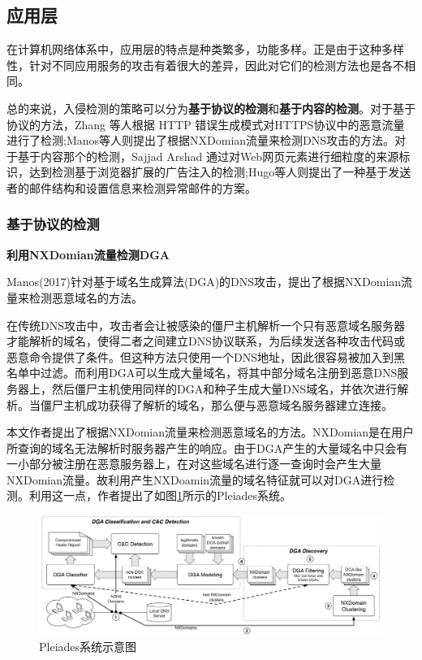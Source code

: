 \documentclass[12pt]{article} %
\begin{document}
\subsection{应用层}
\label{app}

在计算机网络体系中，应用层的特点是种类繁多，功能多样。正是由于这种多样性，针对不同应用服务的攻击有着很大的差异，因此对它们的检测方法也是各不相同。

总的来说，入侵检测的策略可以分为\textbf{基于协议的检测}和\textbf{基于内容的检测}。对于基于协议的方法，Zhang 等人根据 HTTP 错误生成模式对HTTPS协议中的恶意流量进行了检测;Manos等人则提出了根据NXDomian流量来检测DNS攻击的方法。对于基于内容那个的检测，Sajjad Arshad 通过对Web网页元素进行细粒度的来源标识，达到检测基于浏览器扩展的广告注入的检测;Hugo等人则提出了一种基于发送者的邮件结构和设置信息来检测异常邮件的方案。
\subsubsection{基于协议的检测}
\label{protocol}

\textbf{利用NXDomian流量检测DGA}

Manos(2017)\cite{Manos}针对基于域名生成算法(DGA)的DNS攻击，提出了根据NXDomian流量来检测恶意域名的方法。

在传统DNS攻击中，攻击者会让被感染的僵尸主机解析一个只有恶意域名服务器才能解析的域名，使得二者之间建立DNS协议联系，为后续发送各种攻击代码或恶意命令提供了条件。但这种方法只使用一个DNS地址，因此很容易被加入到黑名单中过滤。而利用DGA可以生成大量域名，将其中部分域名注册到恶意DNS服务器上，然后僵尸主机使用同样的DGA和种子生成大量DNS域名，并依次进行解析。当僵尸主机成功获得了解析的域名，那么便与恶意域名服务器建立连接。

本文作者提出了根据NXDomian流量来检测恶意域名的方法。NXDomian是在用户所查询的域名无法解析时服务器产生的响应。由于DGA产生的大量域名中只会有一小部分被注册在恶意服务器上，在对这些域名进行逐一查询时会产生大量NXDomian流量。故利用产生NXDoamin流量的域名特征就可以对DGA进行检测。利用这一点，作者提出了如图\ref{dga_pic}所示的Pleiades系统。

\begin{figure}
	\caption{Pleiades系统示意图}
	\label{dga_pic}
	\includegraphics[width = \linewidth]{./pics/dga.jpg}
\end{figure}
\end{document}
